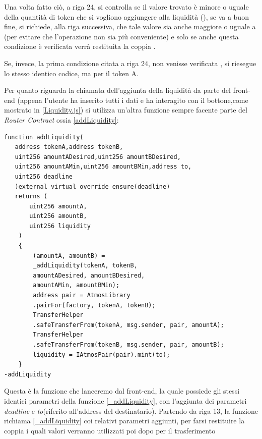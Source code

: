 Una volta fatto ciò, a riga 24, si controlla se il valore trovato è minore o uguale della quantità di token che si vogliono aggiungere alla liquidità (), se va a buon fine, si richiede, alla riga successiva, che tale valore sia anche maggiore o uguale a (per evitare che l'operazione non sia più conveniente) e solo se anche questa condizione è verificata verrà restituita la coppia .

Se, invece, la prima condizione citata a riga 24, non venisse verificata , si riesegue lo stesso identico codice, ma per il token A.

Per quanto riguarda la chiamata dell'aggiunta della liquidità da parte del front-end (appena l'utente ha inserito tutti i dati e ha interagito con il bottone,come mostrato in \ref{Liquidity.js}) si utilizza un'altra funzione sempre facente parte del \textit{Router Contract} ossia \ref{addLiquidity}: \\

\begin{lstlisting}[caption={[\textcourier{addLiquidity()} Function]},language=Solidity] 
function addLiquidity(
   address tokenA,address tokenB,
   uint256 amountADesired,uint256 amountBDesired,
   uint256 amountAMin,uint256 amountBMin,address to,
   uint256 deadline
   )external virtual override ensure(deadline)
   returns (
       uint256 amountA,
       uint256 amountB,
       uint256 liquidity
    )
    {
        (amountA, amountB) =
        _addLiquidity(tokenA, tokenB,
        amountADesired, amountBDesired,
        amountAMin, amountBMin);
        address pair = AtmosLibrary
        .pairFor(factory, tokenA, tokenB);
        TransferHelper
        .safeTransferFrom(tokenA, msg.sender, pair, amountA);
        TransferHelper
        .safeTransferFrom(tokenB, msg.sender, pair, amountB);
        liquidity = IAtmosPair(pair).mint(to);
    }    											        	   			    -addLiquidity
\end{lstlisting}\makeatletter{}\makeatother
\label{addLiquidity}

Questa è la funzione che lanceremo dal front-end, la quale possiede gli stessi identici parametri della funzione \ref{_addLiquidity}, con l'aggiunta dei parametri \textit{deadline} e \textit{to}(riferito all'address del destinatario). 
Partendo da riga 13, la funzione richiama \ref{_addLiquidity} coi relativi parametri aggiunti, per farsi restituire la coppia  i quali valori verranno utilizzati poi dopo per il trasferimento 


